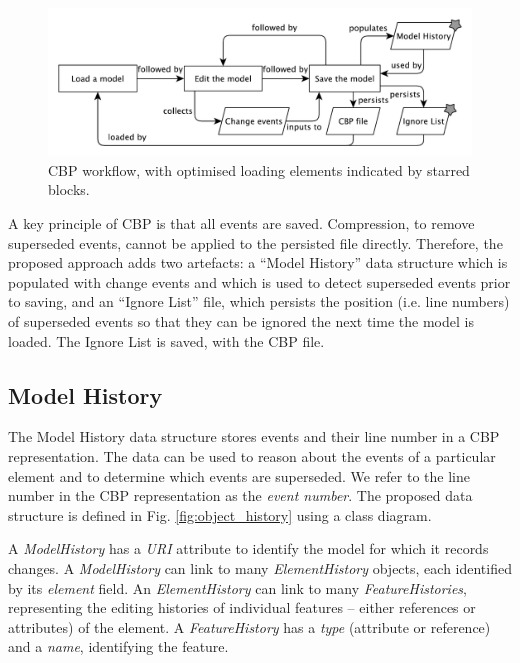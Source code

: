\documentclass{llncs}
\begin{document}
    \begin{figure}[ht]
\centering
\includegraphics[width=\linewidth]{flowchart}
\caption{CBP workflow, with optimised loading elements indicated by starred blocks.}
\label{fig:flowchart}
    \end{figure}

    A key principle of CBP is that all events are saved.  Compression, to remove superseded events, cannot be applied to the persisted file directly.  Therefore, the proposed approach adds two artefacts: a ``Model History'' data structure which is populated with change events and which is used to detect superseded events prior to saving, and an ``Ignore List'' file, which persists the position (i.e. line numbers) of superseded events so that they can be ignored the next time the model is loaded.  The Ignore List is saved, with the CBP file.
    
    \subsection{Model History}
    \label{subsec:model_history}
    The Model History data structure stores events and their line number in a CBP representation.  The data can be used to reason about the events of a particular element and to determine which events are superseded.  We refer to the line number in the CBP representation as the \emph{event number}.
    The proposed data structure is defined in Fig. \ref{fig:object_history} using a class diagram.  
     
    A \emph{ModelHistory} has a \emph{URI} attribute to identify the model for which it records changes.  A \emph{ModelHistory}  can link to many \emph{ElementHistory} objects, each identified by its \emph{element} field. 
    An \emph{ElementHistory} can link to many \emph{FeatureHistories}, representing the editing histories of individual features -- either references or attributes) of the element. 
    A \emph{FeatureHistory} has a \emph{type} (attribute or reference) and a \emph{name}, identifying the feature.
    
\end{document}
